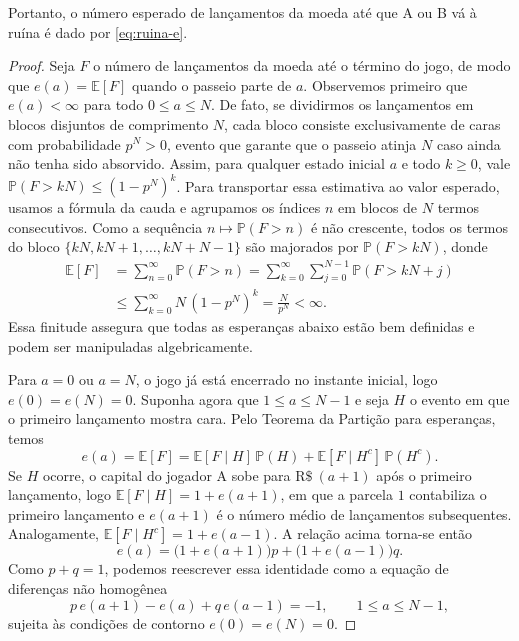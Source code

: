 \documentclass[12pt,portuguese]{article}
\theoremstyle{definition}
\theoremstyle{plainexercise}
\theoremstyle{starredexercise}
\theoremstyle{definition}
\begin{document}
Portanto, o número esperado de lançamentos da moeda até que A ou B vá à ruína
é dado por \eqref{eq:ruina-e}.

\begin{proof}
Seja $F$ o número de lançamentos da moeda até o término do jogo, de modo que
$e(a) = \mathbb{E}[F]$ quando o passeio parte de $a$. Observemos primeiro que
$e(a) < \infty$ para todo $0 \leqslant a \leqslant N$. De fato, se dividirmos
os lançamentos em blocos disjuntos de comprimento $N$, cada bloco consiste
exclusivamente de caras com probabilidade $p^N > 0$, evento que garante que o
passeio atinja $N$ caso ainda não tenha sido absorvido. Assim, para qualquer
estado inicial $a$ e todo $k \geqslant 0$, vale
$\mathbb{P}(F > kN) \leqslant (1 - p^N)^k$. Para transportar essa estimativa
ao valor esperado, usamos a fórmula da cauda e agrupamos os índices $n$ em
blocos de $N$ termos consecutivos. Como a sequência
$n \mapsto \mathbb{P}(F > n)$ é não crescente, todos os termos do bloco
$\{kN, kN + 1, \ldots, kN + N - 1\}$ são majorados por
$\mathbb{P}(F > kN)$, donde
\begin{align*}
  \mathbb{E}[F]
  &= \sum_{n=0}^{\infty} \mathbb{P}(F > n)
   = \sum_{k=0}^{\infty} \sum_{j=0}^{N-1} \mathbb{P}(F > kN + j)
  \\
  &\leqslant \sum_{k=0}^{\infty} N\,(1 - p^N)^k
   = \frac{N}{p^N} < \infty.
\end{align*}
Essa finitude assegura que todas as esperanças abaixo estão bem definidas e
podem ser manipuladas algebricamente.

Para $a = 0$ ou $a = N$, o jogo já está encerrado no instante inicial, logo
$e(0) = e(N) = 0$. Suponha agora que $1 \leqslant a \leqslant N - 1$ e seja
$H$ o evento em que o primeiro lançamento mostra cara. Pelo Teorema da
Partição para esperanças, temos
\[
e(a) = \mathbb{E}[F]
= \mathbb{E}[F \mid H]\,\mathbb{P}(H)
+ \mathbb{E}[F \mid H^c]\,\mathbb{P}(H^c).
\]
Se $H$ ocorre, o capital do jogador A sobe para $\mathrm{R\$}~(a + 1)$ após
o primeiro lançamento, logo $\mathbb{E}[F \mid H] = 1 + e(a + 1)$, em que a
parcela $1$ contabiliza o primeiro lançamento e $e(a + 1)$ é o número médio
de lançamentos subsequentes. Analogamente,
$\mathbb{E}[F \mid H^c] = 1 + e(a - 1)$. A relação acima torna-se então
\[
e(a) = \bigl(1 + e(a + 1)\bigr)p + \bigl(1 + e(a - 1)\bigr)q.
\]
Como $p + q = 1$, podemos reescrever essa identidade como a equação de
diferenças não homogênea
\begin{equation}\label{eq:ruina-dif-e}
p\,e(a + 1) - e(a) + q\,e(a - 1) = -1,
\qquad 1 \leqslant a \leqslant N - 1,
\end{equation}
sujeita às condições de contorno $e(0) = e(N) = 0$.


\end{proof}
\end{document}
